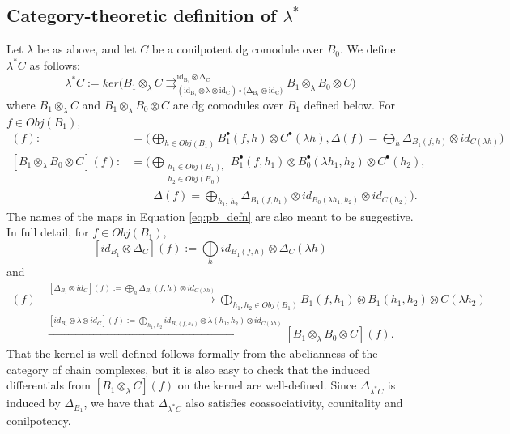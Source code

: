 \subsection{Category-theoretic definition of $\lambda^*$}
\label{sec:pb_defn}
Let $\lambda$ be as above, and let $C$ 
be a conilpotent dg 
comodule over $B_0$. We define 
$\lambda^* C$ as follows:
\begin{equation} \label{eq:pb_defn}
\lambda^*C := 
ker \big( B_1\otimes_\lambda C 
\mathrel{\mathop{\rightrightarrows}^
{\mathrm{id_{B_1}\otimes \Delta_{C}}}_
{\mathrm{(id_{B_1}\otimes \lambda \otimes id_C)
  \circ (\Delta_{B_1}\otimes id_C})}}
B_1 \otimes_\lambda B_0\otimes C \big)
\end{equation}
where $B_1\otimes_\lambda C$ and 
$B_1\otimes_\lambda B_0 \otimes C$ are dg comodules
over $B_1$ defined below. 
For $f \in Obj(B_1)$,
\begin{align*}
[B_1 \otimes_\lambda C](f) 
:&= 
\big(
\bigoplus \limits_{h \in Obj(B_1)} B_1^\bullet(f, h) 
\otimes C^\bullet(\lambda h), 
\Delta(f) = 
\bigoplus \limits_{h} \Delta_{B_1(f, h)} 
\otimes id_{C(\lambda h)}
\big) \\
[B_1 \otimes_\lambda B_0 \otimes C](f) 
:&= 
\big(
\bigoplus \limits_{\substack{h_1 \in Obj(B_1),\\ h_2 \in Obj(B_0)}}
B_1^\bullet(f, h_1) \otimes 
B_0^\bullet(\lambda h_1, h_2) \otimes
C^\bullet(h_2), \\
& \phantom{{}:=\big( {}}
\Delta(f) = 
\bigoplus \limits_{h_1,\,h_2} \Delta_{B_1(f, h_1)} 
\otimes id_{B_0(\lambda h_1, h_2)} 
\otimes id_{C(h_2)}
\big).
\end{align*}
The names of the maps in Equation \ref{eq:pb_defn} 
are also meant to be suggestive. In full detail, 
for $f \in Obj(B_1)$,
$$
{[id_{B_1}\otimes \Delta_{C}]}(f) 
:=
\bigoplus \limits_{h} id_{B_1(f, h)} \otimes \Delta_C(\lambda h)
$$
and 
\begin{align*}
[B_1 \otimes_\lambda C](f)
&\xrightarrow{
{[\Delta_{B_1}\otimes id_C]}(f) :=
\bigoplus \limits_{h} \Delta_{B_1}(f, h) 
  \otimes id_{C(\lambda h)}}
%
\bigoplus \limits_{h_1,h_2 \in Obj(B_1)}
B_1(f, h_1) \otimes B_1(h_1, h_2) 
\otimes C(\lambda h_2) \\
%
&\xrightarrow{
{[id_{B_1}\otimes \lambda \otimes id_C]}(f) := 
\bigoplus \limits_{h_1,\,h_2} id_{B_1(f, h_1)} \otimes \lambda(h_1,h_2)
\otimes id_{C(\lambda h)}}
[B_1 \otimes_\lambda B_0 \otimes C](f). 
\end{align*}
That the kernel is well-defined follows formally from the 
abelianness of the category of chain complexes, but it is also 
easy to check that the induced differentials from 
$[B_1\otimes_\lambda C](f)$ 
on the kernel are well-defined. 
Since $\Delta_{\lambda^*C}$ is 
induced by $\Delta_{B_1}$, we have
that $\Delta_{\lambda^*C}$ also satisfies 
coassociativity, counitality and 
conilpotency.

